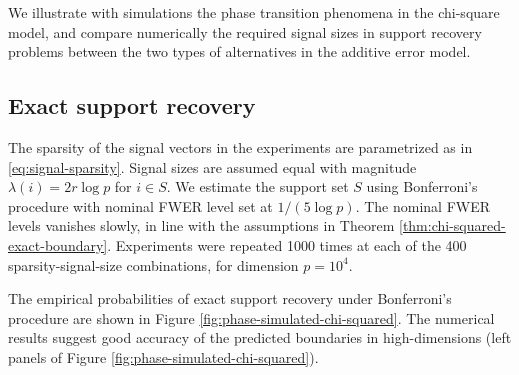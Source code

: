We illustrate with simulations the phase transition phenomena in the chi-square model, and compare numerically the required signal sizes in support recovery problems between the two types of alternatives in the additive error model.  

\subsection{Exact support recovery} \label{sec:ch7-exact-support-numerics}

The sparsity of the signal vectors in the experiments are parametrized as in \eqref{eq:signal-sparsity}. 
Signal sizes are assumed equal with magnitude $\lambda(i)=2r\log{p}$ for $i\in S$.
We estimate the support set $S$ using Bonferroni's procedure with nominal FWER level set at $1/(5{\log{p}})$.
The nominal FWER levels vanishes slowly, in line with the assumptions in Theorem \ref{thm:chi-squared-exact-boundary}.
Experiments were repeated 1000 times at each of the 400 sparsity-signal-size combinations, 
for dimension $p=10^4$.

The empirical probabilities of exact support recovery under Bonferroni's procedure are shown in Figure \ref{fig:phase-simulated-chi-squared}.
The numerical results suggest good accuracy of the predicted boundaries in high-dimensions 
(left panels of Figure \ref{fig:phase-simulated-chi-squared}).

